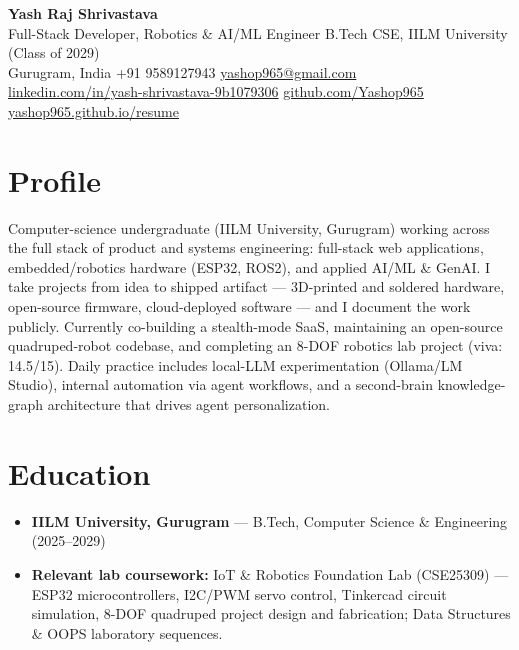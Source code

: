 \documentclass[10pt]{article}
\newcommand{\itemhead}[1]{\textbf{#1}}
\begin{document}
\begin{center}
{\LARGE\textbf{Yash Raj Shrivastava}}\\[3pt]
{\normalsize Full-Stack Developer, Robotics \& AI/ML Engineer \textbar{} B.Tech CSE, IILM University (Class of 2029)}\\[2pt]
{\small Gurugram, India \textbar{} +91 9589127943 \textbar{} \href{mailto:yashop965@gmail.com}{yashop965@gmail.com}\\
\href{https://www.linkedin.com/in/yash-shrivastava-9b1079306/}{linkedin.com/in/yash-shrivastava-9b1079306} \textbar{} \href{https://github.com/Yashop965}{github.com/Yashop965} \textbar{} \href{https://yashop965.github.io/resume/}{yashop965.github.io/resume}}
\end{center}
\vspace{4pt}

\section{Profile}
Computer-science undergraduate (IILM University, Gurugram) working across the full stack of product and systems engineering: full-stack web applications, embedded/robotics hardware (ESP32, ROS2), and applied AI/ML \& GenAI. I take projects from idea to shipped artifact --- 3D-printed and soldered hardware, open-source firmware, cloud-deployed software --- and I document the work publicly. Currently co-building a stealth-mode SaaS, maintaining an open-source quadruped-robot codebase, and completing an 8-DOF robotics lab project (viva: 14.5/15). Daily practice includes local-LLM experimentation (Ollama/LM Studio), internal automation via agent workflows, and a second-brain knowledge-graph architecture that drives agent personalization.

\section{Education}
\begin{itemize}
  \item \itemhead{IILM University, Gurugram} --- B.Tech, Computer Science \& Engineering (2025--2029)
  \item \itemhead{Relevant lab coursework:} IoT \& Robotics Foundation Lab (CSE25309) --- ESP32 microcontrollers, I2C/PWM servo control, Tinkercad circuit simulation, 8-DOF quadruped project design and fabrication; Data Structures \& OOPS laboratory sequences.
\end{itemize}
\end{document}

